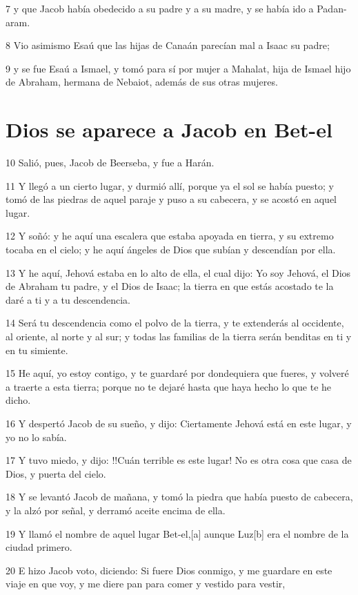 7 y que Jacob había obedecido a su padre y a su madre, y se había ido a Padan-aram.

8 Vio asimismo Esaú que las hijas de Canaán parecían mal a Isaac su padre;

9 y se fue Esaú a Ismael, y tomó para sí por mujer a Mahalat, hija de Ismael hijo de Abraham, hermana de Nebaiot, además de sus otras mujeres.

\section{Dios se aparece a Jacob en Bet-el}

10 Salió, pues, Jacob de Beerseba, y fue a Harán.

11 Y llegó a un cierto lugar, y durmió allí, porque ya el sol se había puesto; y tomó de las piedras de aquel paraje y puso a su cabecera, y se acostó en aquel lugar.

12 Y soñó: y he aquí una escalera que estaba apoyada en tierra, y su extremo tocaba en el cielo; y he aquí ángeles de Dios que subían y descendían por ella.

13 Y he aquí, Jehová estaba en lo alto de ella, el cual dijo: Yo soy Jehová, el Dios de Abraham tu padre, y el Dios de Isaac; la tierra en que estás acostado te la daré a ti y a tu descendencia.

14 Será tu descendencia como el polvo de la tierra, y te extenderás al occidente, al oriente, al norte y al sur; y todas las familias de la tierra serán benditas en ti y en tu simiente.

15 He aquí, yo estoy contigo, y te guardaré por dondequiera que fueres, y volveré a traerte a esta tierra; porque no te dejaré hasta que haya hecho lo que te he dicho.

16 Y despertó Jacob de su sueño, y dijo: Ciertamente Jehová está en este lugar, y yo no lo sabía.

17 Y tuvo miedo, y dijo: !!Cuán terrible es este lugar! No es otra cosa que casa de Dios, y puerta del cielo.

18 Y se levantó Jacob de mañana, y tomó la piedra que había puesto de cabecera, y la alzó por señal, y derramó aceite encima de ella.

19 Y llamó el nombre de aquel lugar Bet-el,[a] aunque Luz[b] era el nombre de la ciudad primero.

20 E hizo Jacob voto, diciendo: Si fuere Dios conmigo, y me guardare en este viaje en que voy, y me diere pan para comer y vestido para vestir,

